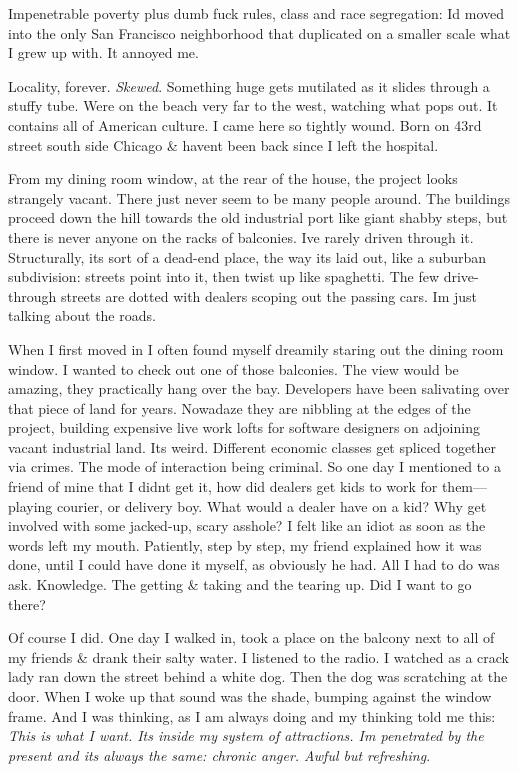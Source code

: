 Impenetrable poverty plus dumb fuck rules, class and race segregation:
Id moved into the only San Francisco neighborhood that duplicated on a
smaller scale what I grew up with. It annoyed me.

Locality, forever. \emph{Skewed}. Something huge gets mutilated as it
slides through a stuffy tube. Were on the beach very far to the west,
watching what pops out. It contains all of American culture. I came here
so tightly wound. Born on 43rd street south side Chicago \& havent been
back since I left the hospital.

From my dining room window, at the rear of the house, the project looks
strangely vacant. There just never seem to be many people around. The
buildings proceed down the hill towards the old industrial port like
giant shabby steps, but there is never anyone on the racks of balconies.
Ive rarely driven through it. Structurally, its sort of a dead-end
place, the way its laid out, like a suburban subdivision: streets point
into it, then twist up like spaghetti. The few drive-through streets are
dotted with dealers scoping out the passing cars. Im just talking about
the roads.

When I first moved in I often found myself dreamily staring out the
dining room window. I wanted to check out one of those balconies. The
view would be amazing, they practically hang over the bay. Developers
have been salivating over that piece of land for years. Nowadaze they
are nibbling at the edges of the project, building expensive live work
lofts for software designers on adjoining vacant industrial land. Its
weird. Different economic classes get spliced together via crimes. The
mode of interaction being criminal. So one day I mentioned to a friend
of mine that I didnt get it, how did dealers get kids to work for
them---playing courier, or delivery boy. What would a dealer have on a
kid? Why get involved with some jacked-up, scary asshole? I felt like an
idiot as soon as the words left my mouth. Patiently, step by step, my
friend explained how it was done, until I could have done it myself, as
obviously he had. All I had to do was ask. Knowledge. The getting \&
taking and the tearing up. Did I want to go there?

Of course I did. One day I walked in, took a place on the balcony next
to all of my friends \& drank their salty water. I listened to the
radio. I watched as a crack lady ran down the street behind a white dog.
Then the dog was scratching at the door. When I woke up that sound was
the shade, bumping against the window frame. And I was thinking, as I am
always doing and my thinking told me this: \emph{This is what I want.
Its inside my system of attractions. Im penetrated by the present and
its always the same: chronic anger. Awful but refreshing}.

